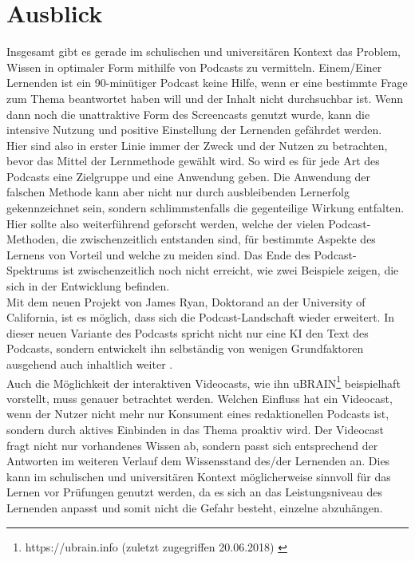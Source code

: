 \documentclass[11pt,a4paper]{scrreprt}
\begin{document}
\section{Ausblick}
Insgesamt gibt es gerade im schulischen und universitären Kontext das Problem, Wissen in optimaler Form mithilfe von Podcasts zu vermitteln. Einem/Einer Lernenden ist ein 90-minütiger Podcast keine Hilfe, wenn er eine bestimmte Frage zum Thema beantwortet haben will und der Inhalt nicht durchsuchbar ist. Wenn dann noch die unattraktive Form des Screencasts genutzt wurde, kann die intensive Nutzung und positive Einstellung der Lernenden gefährdet werden.\\
Hier sind also in erster Linie immer der Zweck und der Nutzen zu betrachten, bevor das Mittel der Lernmethode gewählt wird. So wird es für jede Art des Podcasts eine Zielgruppe und eine Anwendung geben. Die Anwendung der falschen Methode kann aber nicht nur durch ausbleibenden Lernerfolg gekennzeichnet sein, sondern schlimmstenfalls die gegenteilige Wirkung entfalten. Hier sollte also weiterführend geforscht werden, welche der vielen Podcast-Methoden, die zwischenzeitlich entstanden sind, für bestimmte Aspekte des Lernens von Vorteil und welche zu meiden sind. Das Ende des Podcast-Spektrums ist zwischenzeitlich noch nicht erreicht, wie zwei Beispiele zeigen, die sich in der Entwicklung befinden.\\
Mit dem neuen Projekt von James Ryan, Doktorand an der University of California, ist es möglich, dass sich die Podcast-Landschaft wieder erweitert. In dieser neuen Variante des Podcasts spricht nicht nur eine KI den Text des Podcasts, sondern entwickelt ihn selbständig von wenigen Grundfaktoren ausgehend auch inhaltlich weiter \cite{JamesRyan2018}.\\
Auch die Möglichkeit der interaktiven Videocasts, wie ihn uBRAIN\footnote{https://ubrain.info (zuletzt zugegriffen 20.06.2018) \cite{BNUG2016}} beispielhaft vorstellt, muss genauer betrachtet werden. Welchen Einfluss hat ein Videocast, wenn der Nutzer nicht mehr nur Konsument eines redaktionellen Podcasts ist, sondern durch aktives Einbinden in das Thema proaktiv wird. Der Videocast fragt nicht nur vorhandenes Wissen ab, sondern passt sich entsprechend der Antworten im weiteren Verlauf dem Wissensstand des/der Lernenden an. Dies kann im schulischen und universitären Kontext möglicherweise sinnvoll für das Lernen vor Prüfungen genutzt werden, da es sich an das Leistungsniveau des Lernenden anpasst und somit nicht die Gefahr besteht, einzelne abzuhängen.
 
\end{document}
